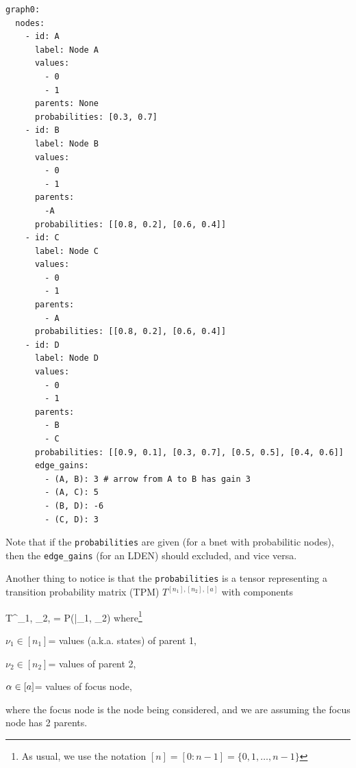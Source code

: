 \begin{mdframed}[hidealllines=true,backgroundcolor=blue!10]
\begin{verbatim}
graph0:
  nodes:
    - id: A
      label: Node A
      values: 
        - 0 
        - 1
      parents: None
      probabilities: [0.3, 0.7]
    - id: B
      label: Node B
      values: 
        - 0 
        - 1
      parents:
        -A
      probabilities: [[0.8, 0.2], [0.6, 0.4]]
    - id: C
      label: Node C
      values:
        - 0
        - 1
      parents: 
        - A   
      probabilities: [[0.8, 0.2], [0.6, 0.4]]
    - id: D
      label: Node D
      values:
        - 0
        - 1
      parents: 
        - B
        - C
      probabilities: [[0.9, 0.1], [0.3, 0.7], [0.5, 0.5], [0.4, 0.6]]
      edge_gains:
        - (A, B): 3 # arrow from A to B has gain 3
        - (A, C): 5
        - (B, D): -6
        - (C, D): 3

\end{verbatim}
\end{mdframed}

Note that if the 
{\tt probabilities}
are given (for a bnet with 
probabilitic nodes), then
the {\tt edge\_gains} (for an LDEN) should
excluded, and vice versa.


Another thing to notice
is that the {\tt probabilities} is a tensor
representing a transition probability matrix (TPM)
$T^{[n_1], [n_2], [a]}$
with components

\beq
 T^{\nu_1, \nu_2, \alp}= P(\alp|\nu_1, \nu_2)
 \eeq
where\footnote{As usual, we use the notation $[n]=[0:n-1]=\{0, 1, \ldots, n-1\}$}

$\nu_1\in[n_1]$= values (a.k.a. states) of parent 1,

$\nu_2\in[n_2]$= values of parent 2, 

$\alpha\in[a]$= values of focus node,

where the focus node is the node
being considered, and we are assuming the focus node has 2 parents.
